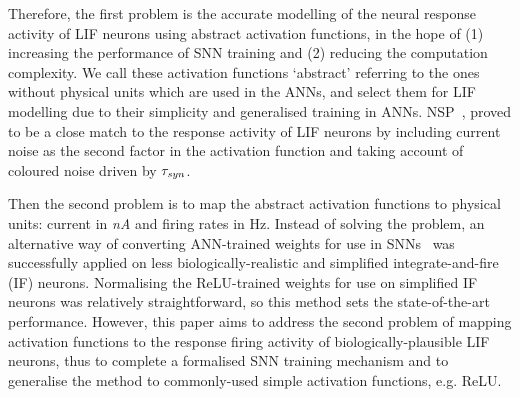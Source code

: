 \documentclass{article}
\begin{document}
	
	Therefore, the first problem is the accurate modelling of the neural response activity of LIF neurons using abstract activation functions, in the hope of (1) increasing the performance of SNN training and (2) reducing the computation complexity.
	We call these activation functions `abstract' referring to the ones without physical units which are used in the ANNs, and select them for LIF modelling due to their simplicity and generalised training in ANNs.
	NSP~\cite{liu2016noisy}, proved to be a close match to the response activity of LIF neurons by including current noise as the second factor in the activation function and taking account of coloured noise driven by $\tau_{\textit{\textrm{syn}}}$.
	
	
	Then the second problem is to map the abstract activation functions to physical units: current in \textit{nA} and firing rates in Hz.
	Instead of solving the problem, an alternative way of converting ANN-trained weights for use in SNNs~\cite{cao2015spiking,diehl2015fast} was successfully applied 
	on less biologically-realistic and simplified integrate-and-fire (IF) neurons.
	Normalising the ReLU-trained weights for use on simplified IF neurons was relatively straightforward, so this method sets the state-of-the-art performance.
	However, this paper aims to address the second problem of mapping activation functions to the response firing activity of biologically-plausible LIF neurons, thus to complete a formalised SNN training mechanism and to generalise the method to commonly-used simple activation functions, e.g. ReLU.
	
	
	
\end{document}
